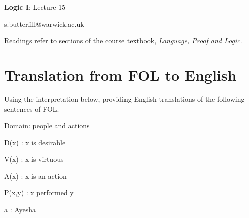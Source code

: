\documentclass[12pt]{extarticle}
\date{}
\makeatletter
\def \ititle {Origins of Mind}
\def \isubtitle {Lecture 08}
\def \iemail{s.butterfill@warwick.ac.uk}
\makeatother
\begin{document}

\begin{multicols*}{3}

\setlength\footnotesep{1em}








\def \ititle {Logic I}
 
\def \isubtitle {Lecture 15}
 
\begin{center}
 
{\Large
 
\textbf{\ititle}: \isubtitle
 
}
 
 
 
\iemail %
 
\end{center}
 
Readings refer to sections of the course textbook, \emph{Language, Proof and Logic}.
 
 
 
\section{Translation from FOL to English}
 
Using the interpretation below, providing English translations of the following sentences of FOL.
 
\hspace{5mm} \begin{minipage}{\columnwidth}
 
\hspace{5mm} Domain: {people and actions}
 
\hspace{5mm} D(x) : x is desirable
 
\hspace{5mm} V(x) : x is virtuous
 
\hspace{5mm} A(x) : x is an action
 
\hspace{5mm} P(x,y) : x performed y
 
\hspace{5mm} a : Ayesha
 

\end{minipage}
\end{multicols*}
\end{document}
